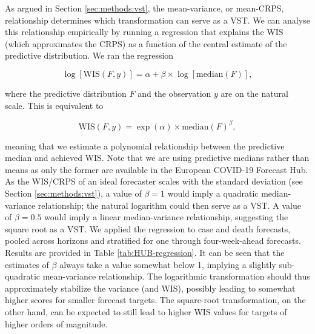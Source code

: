 \documentclass{article}
\begin{document}
As argued in Section \ref{sec:methods:vst}, the mean-variance, or mean-CRPS, relationship determines which transformation can serve as a VST. We can analyse this relationship empirically by running a regression that explains the WIS (which approximates the CRPS) as a function of the central estimate of the predictive distribution. We ran the regression
\begin{linenomath*}
\begin{equation}
    \log[\text{WIS}(F, y)] = \alpha + \beta \times \log[\text{median}(F)], 
\end{equation}
\end{linenomath*}
where the predictive distribution $F$ and the observation $y$ are on the natural scale. This is equivalent to
\begin{linenomath*}
\begin{equation}
    \text{WIS}(F, y) = \exp(\alpha) \times \text{median}(F)^\beta, 
\end{equation}
\end{linenomath*}
meaning that we estimate a polynomial relationship between the predictive median and achieved WIS. Note that we are using predictive medians rather than means as only the former are available in the European COVID-19 Forecast Hub. As the WIS/CRPS of an ideal forecaster scales with the standard deviation (see Section \ref{sec:methods:vst}), a value of $\beta = 1$ would imply a quadratic median-variance relationship; the natural logarithm could then serve as a VST. A value of $\beta = 0.5$ would imply a linear median-variance relationship, suggesting the square root as a VST. We applied the regression to case and death forecasts, pooled across horizons and stratified for one through four-week-ahead forecasts. Results are provided in Table \ref{tab:HUB-regression}. It can be seen that the estimates of $\beta$ always take a value somewhat below 1, implying a slightly sub-quadratic mean-variance relationship. The logarithmic transformation should thus approximately stabilize the variance (and WIS), possibly leading to somewhat higher scores for smaller forecast targets. The square-root transformation, on the other hand, can be expected to still lead to higher WIS values for targets of higher orders of magnitude.
\end{document}
